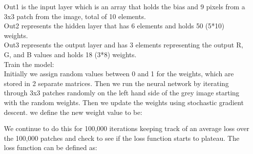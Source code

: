 \documentclass{article}
\theoremstyle{definition}
\begin{document}
        \begin{figure}[H]
            \centering
        \end{figure}
                
        Out1 is the input layer which is an array that holds the bias and 9 pixels from a 3x3 patch from the image, total of 10 elements. \\
        Out2 represents the hidden layer that has 6 elements and holds 50 (5*10) weights. \\
        Out3 represents the output layer and has 3 elements representing the output R, G, and B values and holds 18 (3*8) weights. \\
        
        Train the model: \\
        Initially we assign random values between 0 and 1 for the weights, which are stored in 2 separate matrices. Then we run the neural network by iterating through 3x3 patches randomly on the left hand side of the grey image starting with the random weights. Then we update the weights using stochastic gradient descent. we define the new weight value to be: \\
        
        \begin{figure}[H]
            \centering
        \end{figure}
        
        We continue to do this for 100,000 iterations keeping track of an average loss over the 100,000 patches and check to see if the loss function starts to plateau. The loss function can be defined as:\\
        
        \begin{figure}[H]
            \centering
        \end{figure}
        
\end{document}
